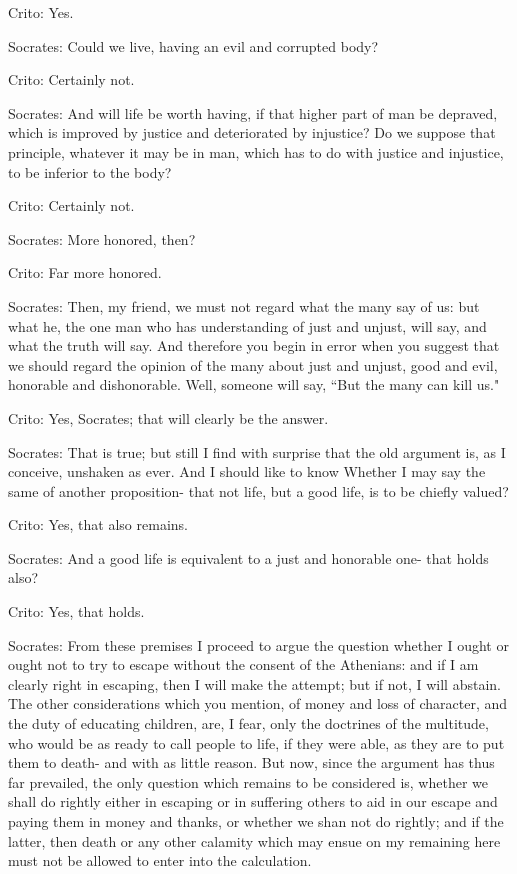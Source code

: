 Crito: Yes. 

Socrates: Could we live, having an evil and corrupted body? 

Crito: Certainly not. 

Socrates: And will life be worth having, if that higher part of man be
depraved, which is improved by justice and deteriorated by injustice?
Do we suppose that principle, whatever it may be in man, which has
to do with justice and injustice, to be inferior to the body?

Crito: Certainly not. 

Socrates: More honored, then? 

Crito: Far more honored. 

Socrates: Then, my friend, we must not regard what the many say of us:
but what he, the one man who has understanding of just and unjust,
will say, and what the truth will say. And therefore you begin in
error when you suggest that we should regard the opinion of the many
about just and unjust, good and evil, honorable and dishonorable.
Well, someone will say, ``But the many can kill us." 

Crito: Yes, Socrates; that will clearly be the answer. 

Socrates: That is true; but still I find with surprise that the old argument
is, as I conceive, unshaken as ever. And I should like to know Whether
I may say the same of another proposition- that not life, but a good
life, is to be chiefly valued? 

Crito: Yes, that also remains. 

Socrates: And a good life is equivalent to a just and honorable one- that
holds also? 

Crito: Yes, that holds. 

Socrates: From these premises I proceed to argue the question whether I
ought or ought not to try to escape without the consent of the Athenians:
and if I am clearly right in escaping, then I will make the attempt;
but if not, I will abstain. The other considerations which you mention,
of money and loss of character, and the duty of educating children,
are, I fear, only the doctrines of the multitude, who would be as
ready to call people to life, if they were able, as they are to put
them to death- and with as little reason. But now, since the argument
has thus far prevailed, the only question which remains to be considered
is, whether we shall do rightly either in escaping or in suffering
others to aid in our escape and paying them in money and thanks, or
whether we shan not do rightly; and if the latter, then death or any
other calamity which may ensue on my remaining here must not be allowed
to enter into the calculation. 

